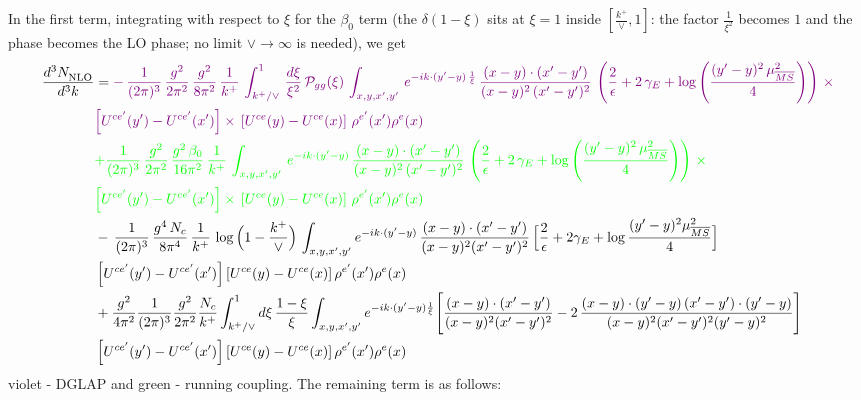 \documentclass[9pt]{article}
\numberwithin{equation}{section}
\begin{document}
In the first term, integrating with respect to $\xi$ for the $\beta_{0}$ term (the
$\delta(1-\xi)$ sits at $\xi=1$ inside $[\frac{k^{+}}{\vee},1]$: the factor $\frac{1}{\xi^{2}}$
becomes $1$ and the phase becomes the LO phase; no limit $\vee\to\infty$ is needed), we get
\begin{align} \label{eq:master}
\frac{d^{3}N_{\rm NLO}^{\rm}}{d^{3}k}  & =
   {\color{violet} -\,\frac{1}{(2\pi)^{3}}\,\frac{g^{2}}{2\pi^{2}}\,\frac{g^{2}}{8\pi^{2}}\,\frac{1}{k^{+}}\,\int_{k^{+}/\vee}^{1}\, \frac{d\xi}{\xi^{2}}\,\mathcal{P}_{gg}(\xi)\,\int_{x,y,x',y'}\, e^{-ik\cdot (y'-y)\,\frac{1}{\xi}}\, \frac{(x-y)\cdot (x'-y')}{(x-y)^{2}\,(x'-y')^{2}}\,\left(\frac{2}{\epsilon}+2\,\gamma_{E}+\log{\left(\frac{(y'-y)^{2}\,\mu^{2}_{\overline{MS}}}{4}\right)}\right)\,\times}\notag \\ &  {\color{violet}\left[U^{ce'}(y') - U^{ce'}(x')\right] \times\, \left[U^{ce}(y) - U^{ce}(x)\right]\, \rho^{e'}(x') \rho^{e}(x)}
    \notag \\ & {\color{green}+\frac{1}{(2\pi)^{3}}\, \frac{g^{2}}{2\pi^{2}}\,\frac{g^{2}\,\beta_{0}}{16\pi^{2}}\, \frac{1}{k^{+}}\,\int_{x,y,x',y'}\, e^{-ik\cdot (y'-y)}\, \frac{(x-y)\cdot (x'-y')}{(x-y)^{2}\,(x'-y')^{2}}\,\left(\frac{2}{\epsilon}+2\,\gamma_{E}+\log{\left(\frac{(y'-y)^{2}\,\mu^{2}_{\overline{MS}}}{4}\right)}\right)\,\times}\notag \\ &  {\color{green}\left[U^{ce'}(y') - U^{ce'}(x')\right] \times\, \left[U^{ce}(y) - U^{ce}(x)\right]\, \rho^{e'}(x') \rho^{e}(x)}\notag \\ &
-\,\frac{1}{(2\pi)^{3}}\,\frac{g^{4}\,N_{c}}{8\pi^{4}}\,\frac{1}{k^{+}}\,\log\Big(1-\frac{k^{+}}{\vee}\Big)\,\int_{x,y,x',y'}e^{-ik\cdot(y'-y)}\,\frac{(x-y)\cdot(x'-y')}{(x-y)^{2}(x'-y')^{2}}\,\Big[\frac{2}{\epsilon}+2\gamma_{E}+\log\frac{(y'-y)^{2}\mu^{2}_{\overline{MS}}}{4}\Big]\notag \\ & \left[U^{ce'}(y')-U^{ce'}(x')\right]\left[U^{ce}(y)-U^{ce}(x)\right]\rho^{e'}(x')\rho^{e}(x)\notag\\
&+\frac{g^{2}}{4\pi^{2}}\frac{1}{(2\pi)^{3}}\frac{g^{2}}{2\pi^{2}}\frac{N_{c}}{k^{+}}\int_{k^{+}/\vee}^{1}d\xi\,\frac{1-\xi}{\xi}\int_{x,y,x',y'}e^{-ik\cdot(y'-y)\frac{1}{\xi}}\Bigg[\frac{(x-y)\cdot(x'-y')}{(x-y)^{2}(x'-y')^{2}}-2\,\frac{(x-y)\cdot(y'-y)\,(x'-y')\cdot(y'-y)}{(x-y)^{2}(x'-y')^{2}(y'-y)^{2}}\Bigg]\notag \\ & \left[U^{ce'}(y')-U^{ce'}(x')\right]\left[U^{ce}(y)-U^{ce}(x)\right]\rho^{e'}(x')\rho^{e}(x)
\end{align}
{\color{violet} violet - DGLAP} and {\color{green} green - running coupling}. The remaining term is as follows:
\end{document}
